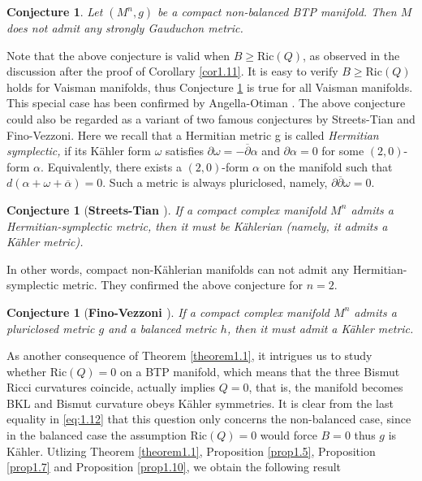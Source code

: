 \documentclass{amsart}
\numberwithin{equation}{section}
\newtheorem{conjecture}  [theorem]     {Conjecture}
\theoremstyle{definition}
\renewcommand{\1}{\mathds{1}}
\renewcommand{\>}{\rightarrow}
\begin{document}
\begin{conjecture}\label{conj1.12}
Let $(M^n,g)$ be a compact non-balanced BTP manifold. Then $M$ does not admit any strongly Gauduchon metric.
\end{conjecture}


Note that the above conjecture is valid when $B \geq \mbox{Ric}(Q)$, as observed in the discussion after the proof of Corollary \ref{cor1.11}.
It is easy to verify $B \geq \mbox{Ric}(Q)$ holds for Vaisman manifolds, thus Conjecture \ref{conj1.12} is true for all Vaisman manifolds.
This special case has been confirmed by Angella-Otiman \cite{AO}. The above conjecture could also be regarded as a variant
of two famous conjectures by Streets-Tian and Fino-Vezzoni. Here we recall that a Hermitian metric g is called {\em Hermitian symplectic,}
if its K\"ahler form $\omega$ satisfies $\partial \omega = -\overline{\partial} \alpha$ and $\partial \alpha =0$ for some $(2,0)$-form $\alpha$.
Equivalently, there exists a $(2,0)$-form $\alpha$ on the manifold such that $d(\alpha + \omega + \overline{\alpha })=0$.
Such a metric is always pluriclosed, namely, $\partial\overline{\partial}  \omega=0$.

\begin{conjecture}[{\bf Streets-Tian \cite{ST10}}]
If a compact complex manifold $M^n$ admits a
Hermitian-symplectic metric, then it must be K\"ahlerian (namely, it admits a K\"ahler metric).
\end{conjecture}

In other words, compact non-K\"ahlerian manifolds can not admit any Hermitian-symplectic metric. They confirmed the above conjecture for $n=2$.

\begin{conjecture}[{\bf Fino-Vezzoni \cite{FV2}}]
If a compact complex manifold $M^n$ admits a pluriclosed metric $g$ and a balanced metric $h$,
then it must admit a K\"ahler metric.
\end{conjecture}

As another consequence of Theorem \ref{theorem1.1}, it intrigues us to study whether
$\mathrm{Ric}(Q)=0$ on a BTP manifold, which means  that the three Bismut Ricci curvatures coincide,
actually implies $Q=0$, that is, the manifold becomes BKL and Bismut curvature obeys K\"ahler symmetries.
It is clear from the last equality in \eqref{eq:1.12} that this question only concerns the non-balanced case,
since in the balanced case the assumption $\mathrm{Ric}(Q)=0$ would force $B=0$ thus $g$ is K\"ahler.
Utlizing Theorem \ref{theorem1.1}, Proposition \ref{prop1.5}, Proposition \ref{prop1.7}
and Proposition \ref{prop1.10}, we obtain the following result
\end{document}
